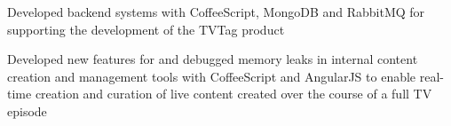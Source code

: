 \begin{job}

  \begin{accomplishments}
    \item Developed backend systems with CoffeeScript, MongoDB and RabbitMQ for
    supporting the development of the TVTag product
    \item Developed new features for and debugged memory leaks in internal content
    creation and management tools with CoffeeScript and AngularJS to enable
    real-time creation and curation of live content created over the course of a
    full TV episode
  \end{accomplishments}
\end{job}
